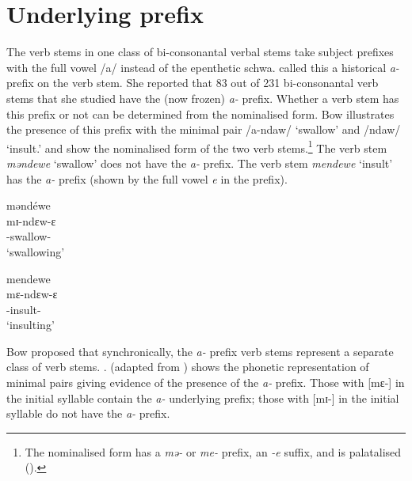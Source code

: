 \section{Underlying prefix}\label{sec:6.5}
\hypertarget{RefHeading1211981525720847}{}
The verb stems in one class of bi-consonantal verbal stems take subject prefixes with the full vowel /a/ instead of the epenthetic schwa. \citet{Bow1997c} called this a historical \textit{a-} prefix on the verb stem. She reported that 83 out of 231 bi-consonantal verb stems that she studied have the (now frozen)  \textit{a-} prefix. Whether a verb stem has this prefix or not can be determined from the nominalised form. Bow illustrates the presence of this prefix with the minimal pair /a-ndaw/ ‘swallow’ and /ndaw/ ‘insult.’  and  show the nominalised form of the two verb stems.\footnote{The nominalised form has a \textit{mə{}-} or \textit{me-} prefix, an \textit{{}-e} suffix, and is palatalised ().} The verb stem \textit{məndewe} ‘swallow’ does not have the \textit{a-} prefix. The verb stem \textit{mendewe} ‘insult’ has the \textit{a-} prefix (shown by the full vowel \textit{e} in the prefix).

\ea \label{ex:6:13}
mənd\'{e}we\\
\gll  mɪ-ndɛw-ɛ \\     
      {\NOM}{}-swallow-{\CL}\\
\glt  ‘swallowing’      
\z

\ea \label{ex:6:14}
mendewe\\
\gll  mɛ-ndɛw-ɛ\\
      {\NOM}{}-insult-{\CL}\\
\glt  ‘insulting’
\z

Bow proposed that synchronically, the \textit{a-} prefix verb stems represent a separate class of verb stems. . (adapted from \citealt{Bow1997c}) shows the phonetic representation of minimal pairs giving evidence of the presence of the \textit{a-} prefix. Those with [mɛ-] in the initial syllable contain the \textit{a-} underlying prefix; those with [mɪ-] in the initial syllable do not have the \textit{a-} prefix.

